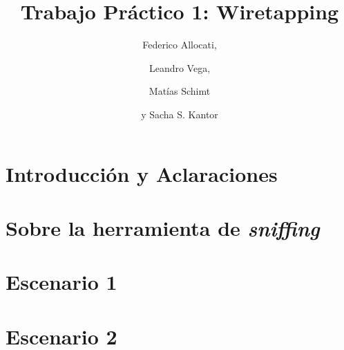 \documentclass[%
	final,
	notitlepage,
	narroweqnarray,
	inline,
	twoside,
	]{ieee}
\newcommand{\latexiie}{\LaTeX2{\Large$_\varepsilon$}}
\begin{document}
\title[Trabajo Pr\'actico 1: Wiretapping]{%
       Trabajo Pr\'actico 1: Wiretapping}

\author[ALLOCATI, VEGA, SCHMIT AND KANTOR]{%
    Federico Allocati,
    \and{} Leandro Vega,
    \and{} Mat\'ias Schimt
    \and{} y Sacha S. Kantor
}



\maketitle

\begin{abstract}
	
\end{abstract}


\section*{Introducci\'on y Aclaraciones}\label{sec:introduccion}
	

\section*{Sobre la herramienta de \textit{sniffing}}
	

\section{Escenario 1}
	

\section{Escenario 2}
	
\end{document}
